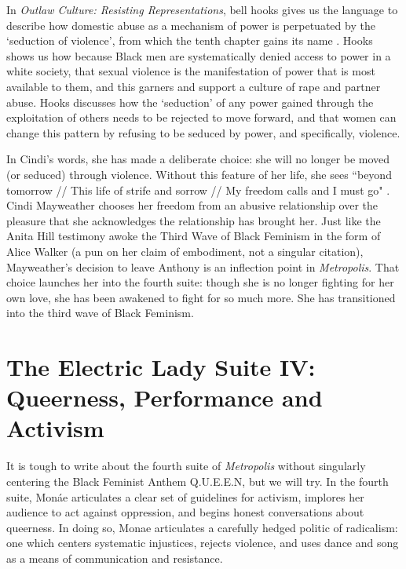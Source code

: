 \documentclass[a4paper, 11pt]{article} %
\begin{document}
In \emph{Outlaw Culture: Resisting Representations}, bell hooks gives us the language to describe how domestic abuse as a mechanism of power is perpetuated by the `seduction of violence', from which the tenth chapter gains its name \cite{hooks1994outlaw}.
Hooks shows us how because Black men are systematically denied access to power in a white society, that sexual violence is the manifestation of power that is most available to them, and this garners and support a culture of rape and partner abuse.
Hooks discusses how the `seduction' of any power gained through the exploitation of others needs to be rejected to move forward, and that women can change this pattern by refusing to be seduced by power, and specifically, violence.


In Cindi's words, she has made a deliberate choice: she will no longer be moved (or seduced) through violence. 
Without this feature of her life, she sees ``beyond tomorrow // This life of strife and sorrow // My freedom calls and I must go" \cite{babopbyeya}.
Cindi Mayweather chooses her freedom from an abusive relationship over the pleasure that she acknowledges the relationship has brought her.
Just like the Anita Hill testimony awoke the Third Wave of Black Feminism in the form of Alice Walker \cite{alicewalker} (a pun on her claim of embodiment, not a singular citation), Mayweather's decision to leave Anthony is an inflection point in \emph{Metropolis}.
That choice launches her into the fourth suite: though she is no longer fighting for her own love, she has been awakened to fight for so much more. 
She has transitioned into the third wave of Black Feminism.



\section*{The Electric Lady Suite IV: Queerness, Performance and Activism}

It is tough to write about the fourth suite of \emph{Metropolis} without singularly centering the Black Feminist Anthem Q.U.E.E.N, but we will try.
In the fourth suite, Mon\'ae articulates a clear set of guidelines for activism, implores her audience to act against oppression, and begins honest conversations about queerness.
In doing so, Monae articulates a carefully hedged politic of radicalism: one which centers systematic injustices, rejects violence, and uses dance and song as a means of communication and resistance.
\end{document}
